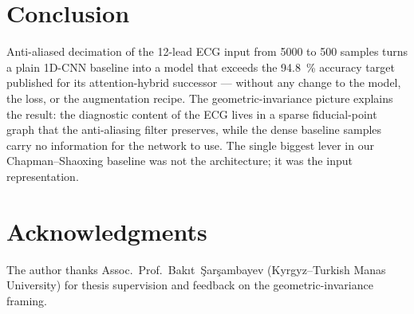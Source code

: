 \documentclass[conference]{IEEEtran}
\begin{document}
\section{Conclusion}
Anti-aliased decimation of the 12-lead ECG input from \num{5000} to
\num{500} samples turns a plain 1D-CNN baseline into a model that
exceeds the \SI{94.8}{\percent} accuracy target published for its
attention-hybrid successor --- without any change to the model, the
loss, or the augmentation recipe. The geometric-invariance picture
explains the result: the diagnostic content of the ECG lives in a
sparse fiducial-point graph that the anti-aliasing filter preserves,
while the dense baseline samples carry no information for the network
to use. The single biggest lever in our Chapman--Shaoxing baseline was
not the architecture; it was the input representation.

\section*{Acknowledgments}
The author thanks Assoc.\ Prof.\ Bak\i t\ \c{S}ar\c{s}ambayev (Kyrgyz--Turkish
Manas University) for thesis supervision and feedback on the
geometric-invariance framing.
\end{document}
